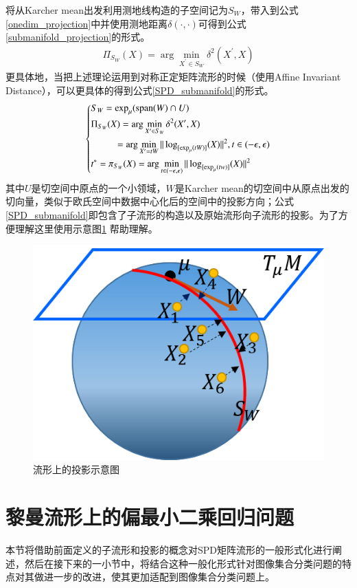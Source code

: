 将从Karcher mean出发利用测地线构造的子空间记为$S_W$，带入到公式\ref{onedim_projection}中并使用测地距离$\delta(\cdot,\cdot)$可得到公式\ref{submanifold_projection}的形式。
\begin{equation}
\label{submanifold_projection}
\begin{split}
\Pi_{S_W}(X)=\arg\min_{X^{\prime} \in S_W}\delta^{2}(X^{\prime},X)
\end{split}
\end{equation}
更具体地，当把上述理论运用到对称正定矩阵流形的时候（使用Affine Invariant Distance\cite{AIM_metric}），可以更具体的得到公式\ref{SPD_submanifold}的形式。
\begin{equation}
\label{SPD_submanifold}
\left\{
\begin{split}
\begin{aligned}
&S_W=\exp_\mu({\rm{span}}(W)\cap U)\\
&\Pi_{S_W}(X)=\arg\min_{X^{\prime} \in S_W}\delta^{2}(X^{\prime},X)\\
&~~~~~~~~~~=\arg\min_{X^{\prime}=tW}\|\log_{[\exp_{\mu}(tW)]}(X)\|^2,t \in (-\epsilon,\epsilon)\\
&t^{*}=\pi_{S_W}(X)=\arg\min_{t \in (-\epsilon,\epsilon)}\|\log_{[\exp_{\mu}(tw)]}(X)\|^2
\end{aligned}
\end{split}
\right.
\end{equation}
其中$U$是切空间中原点的一个小领域，$W$是Karcher mean的切空间中从原点出发的切向量，类似于欧氏空间中数据中心化后的空间中的投影方向；公式\ref{SPD_submanifold}即包含了子流形的构造以及原始流形向子流形的投影。为了方便理解这里使用示意图\ref{fig:SPD_SubManifold}
帮助理解。
\begin{figure}
	\centering
	\includegraphics[width=0.5\linewidth]{source/SPD_submanifold.png}
	\caption{流形上的投影示意图}
	\label{fig:SPD_SubManifold}
\end{figure}
\section{黎曼流形上的偏最小二乘回归问题}
\label{sec:RPLS}
本节将借助前面定义的子流形和投影的概念对SPD矩阵流形的一般形式化进行阐述，然后在接下来的一小节中，将结合这种一般化形式针对图像集合分类问题的特点对其做进一步的改进，使其更加适配到图像集合分类问题上。
